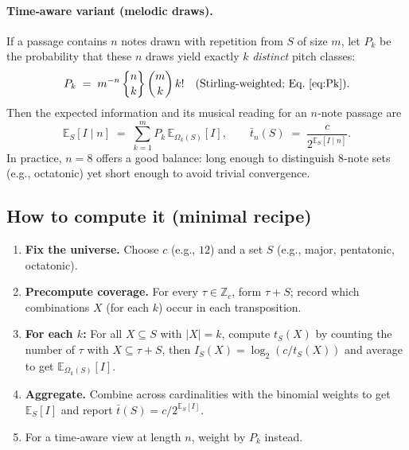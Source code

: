\documentclass[10pt,twocolumn]{article}
\numberwithin{equation}{section} %
\newcommand{\Stirling}[2]{\genfrac\{\}{0pt}{}{#1}{#2}}
\begin{document}
    \paragraph{Time‑aware variant (melodic draws).}
    If a passage contains $n$ notes drawn with repetition from $S$ of size $m$, let $P_k$ be the probability that these $n$ draws yield exactly $k$ \emph{distinct} pitch classes:
    \[
        P_k \;=\; m^{-n}\,\Stirling{n}{k}\,\binom{m}{k}\,k!
        \quad\text{(Stirling‑weighted; Eq.~\ref{eq:Pk}).}
    \]
    Then the expected information and its musical reading for an $n$‑note passage are
    \[
        \mathbb{E}_S[I \mid n]
        \;=\; \sum_{k=1}^{m} P_k \, \mathbb{E}_{\Omega_k(S)}[I],
        \qquad
        \bar{t}_n(S) \;=\; \frac{c}{2^{\mathbb{E}_S[I \mid n]}}.
    \]
    In practice, $n{=}8$ offers a good balance: long enough to distinguish 8‑note sets (e.g., octatonic) yet short enough to avoid trivial convergence.

    \subsection*{How to compute it (minimal recipe)}
    \begin{enumerate}
        \item \textbf{Fix the universe.} Choose $c$ (e.g., $12$) and a set $S$ (e.g., major, pentatonic, octatonic).
        \item \textbf{Precompute coverage.} For every $\tau\in \mathbb{Z}_c$, form $\tau{+}S$; record which combinations $X$ (for each $k$) occur in each transposition.
        \item \textbf{For each $k$:} For all $X{\subseteq}S$ with $|X|{=}k$, compute $t_S(X)$ by counting the number of $\tau$ with $X\subseteq \tau{+}S$, then $I_S(X)=\log_2(c/t_S(X))$ and average to get $\mathbb{E}_{\Omega_k(S)}[I]$.
        \item \textbf{Aggregate.} Combine across cardinalities with the binomial weights to get $\mathbb{E}_S[I]$ and report $\bar{t}(S)=c/2^{\mathbb{E}_S[I]}$.
        \item For a time‑aware view at length $n$, weight by $P_k$ instead.
    \end{enumerate}
\end{document}
